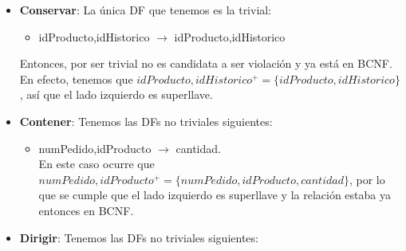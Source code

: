 \documentclass[11pt,letterpaper]{article}
\begin{document}
\begin{itemize}
\begin{itemize}
\item {\footnotesize \textbf{CPEdoCliente}(\underline{CP},estado)} con:
\begin{itemize}
\item CP $\rightarrow$ estado.\\\\ Tenemos que $CP^+ = \{CP,estado\}$. Entonces, el lado izquierdo es superllave y ya no hay violación \checkmark
\end{itemize}
\item {\footnotesize \textbf{Cliente}(\underline{taquiClave}, email, telefono, nombre, apellidoPaterno, apellidoMaterno,  municipio, colonia, calle, CP, numeroInterior, numExterior, estado, fechaPrimerVisita, numPuntos)} con:
\begin{itemize}
\item taquiClave $\rightarrow$  email, telefono, nombre, apellidoPaterno, apellidoMaterno,  municipio, colonia, calle, CP, numeroInterior, numExterior, estado, fechaPrimerVisita, numPuntos\\\\Como ocurre que $taquiClave^+=\{taquiClave,email, telefono, nombre,\\apellidoPaterno, apellidoMaterno,  municipio, colonia,\\calle, CP, numeroInterior, numExterior, estado, fechaPrimerVisita, numPuntos\}$, entonces el lado izquierdo es superllave y no hay violación. \checkmark
\end{itemize}
\end{itemize}

Y ya hemos normalizado la relación a BCNF.

\item \textbf{Conservar}: La única DF que tenemos es la trivial:

\begin{itemize}
\item idProducto,idHistorico $\rightarrow$ idProducto,idHistorico
\end{itemize}

Entonces, por ser trivial no es candidata a ser violación y ya está en BCNF. En efecto, tenemos que $idProducto,idHistorico^+ = \{idProducto,idHistorico\}$, así que el lado izquierdo es superllave. \checkmark
\item \textbf{Contener}: Tenemos las DFs no triviales siguientes:

\begin{itemize}
\item numPedido,idProducto $\rightarrow$ cantidad.\\ En este caso ocurre que $numPedido,idProducto^+=\{numPedido,idProducto,cantidad\}$, por lo que se cumple que el lado izquierdo es superllave y la relación estaba ya entonces en BCNF. \checkmark
\end{itemize}
\item \textbf{Dirigir}: Tenemos las DFs no triviales siguientes:


\end{itemize}
\end{document}
